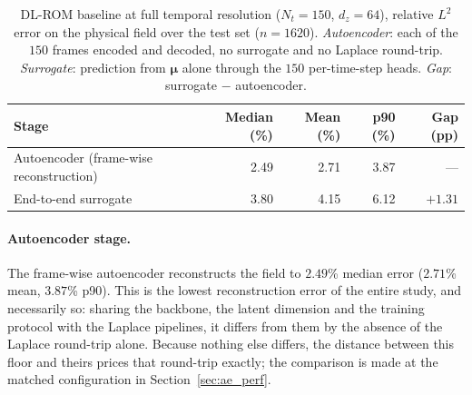 ﻿\documentclass[a4paper,12pt]{article}
\theoremstyle{definition}
\theoremstyle{remark}
\newcommand{\vmu}{\bm{\mu}}
\begin{document}
\begin{table}[htbp]
    \centering
    \small
    \setlength{\tabcolsep}{6pt}
    \renewcommand{\arraystretch}{1.3}
    \begin{tabular}{lrrrr}
        \toprule
        \textbf{Stage} & \textbf{Median (\%)} & \textbf{Mean (\%)} & \textbf{p90 (\%)} & \textbf{Gap (pp)} \\
        \midrule
        Autoencoder (frame-wise reconstruction) & 2.49 & 2.71 & 3.87 & --- \\
        End-to-end surrogate                    & 3.80 & 4.15 & 6.12 & $+1.31$ \\
        \bottomrule
    \end{tabular}
    \caption{DL-ROM baseline at full temporal resolution ($N_t = 150$, $d_z = 64$), relative $L^2$ error on the physical field over the test set ($n = 1620$). \emph{Autoencoder}: each of the $150$ frames encoded and decoded, no surrogate and no Laplace round-trip. \emph{Surrogate}: prediction from $\vmu$ alone through the $150$ per-time-step heads. \emph{Gap}: surrogate $-$ autoencoder.}
    \label{tab:dlrom_stages}
\end{table}

\paragraph{Autoencoder stage.} The frame-wise autoencoder reconstructs the field to $2.49$\% median error ($2.71$\% mean, $3.87$\% p90). This is the lowest reconstruction error of the entire study, and necessarily so: sharing the backbone, the latent dimension and the training protocol with the Laplace pipelines, it differs from them by the absence of the Laplace round-trip alone. Because nothing else differs, the distance between this floor and theirs prices that round-trip exactly; the comparison is made at the matched configuration in Section~\ref{sec:ae_perf}.
\end{document}
